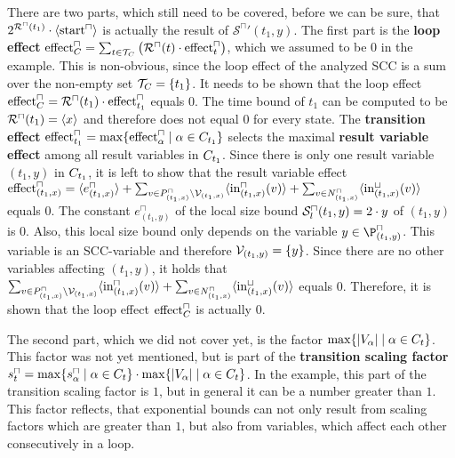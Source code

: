 There are two parts, which still need to be covered, before we can be sure, that $2^{{\mathcal{R}^\sqcap}(t_1)} \cdot \langle\text{start}^\sqcap\rangle$ is actually the result of ${\mathcal{S}^\sqcap}'(t_1,y)$.
The first part is the \textbf{loop effect} $\text{effect}^\sqcap_C = \sum_{t \in \mathcal{T}_C} \left( {\mathcal{R}^\sqcap}(t) \cdot \text{effect}^\sqcap_t \right)$, which we assumed to be $0$ in the example.
This is non-obvious, since the loop effect of the analyzed SCC is a sum over the non-empty set $\mathcal{T}_C = \lbrace t_1 \rbrace$.
It needs to be shown that the loop effect $\text{effect}^\sqcap_C = {\mathcal{R}^\sqcap}(t_1) \cdot \text{effect}^\sqcap_{t_1}$ equals $0$.
The time bound of $t_1$ can be computed to be ${\mathcal{R}^\sqcap}(t_1) = \langle x\rangle$ and therefore does not equal $0$ for every state.
The \textbf{transition effect} $\text{effect}^\sqcap_{t_1} = \max \lbrace \text{effect}^\sqcap_\alpha \mid \alpha \in C_{t_1}  \rbrace$ selects the maximal \textbf{result variable effect} among all result variables in $C_{t_1}$.
Since there is only one result variable $(t_1,y)$ in $C_{t_1}$, it is left to show that the result variable effect $\text{effect}^\sqcap_{(t_1,x)} = \langle e^\sqcap_{(t_1,x)}\rangle + \sum_{v \in P_{(t_1,x)}^\sqcap \setminus \mathcal{V}_{(t_1,x)}} \langle\text{in}^\sqcap_{(t_1,x)}(v)\rangle + \sum_{v \in N_{(t_1,x)}^\sqcap} \langle\text{in}^\sqcup_{(t_1,x)}(v)\rangle$ equals $0$.
The constant $e^\sqcap_{(t_1,y)}$ of the local size bound ${\mathcal{S}^\sqcap_l}(t_1,y) = 2 \cdot y$ of $(t_1,y)$ is $0$.
Also, this local size bound only depends on the variable $y \in \P^\sqcap_{(t_1,y)}$.
This variable is an SCC-variable and therefore $\mathcal{V}_{(t_1,y)} = \lbrace y \rbrace$.
Since there are no other variables affecting $(t_1,y)$, it holds that $\sum_{v \in P_{(t_1,x)}^\sqcap \setminus \mathcal{V}_{(t_1,x)}} \langle\text{in}^\sqcap_{(t_1,x)}(v)\rangle + \sum_{v \in N_{(t_1,x)}^\sqcap} \langle\text{in}^\sqcup_{(t_1,x)}(v)\rangle$ equals $0$.
Therefore, it is shown that the loop effect $\text{effect}^\sqcap_C$ is actually $0$.

The second part, which we did not cover yet, is the factor $\max \lbrace \left|V_\alpha\right| \mid \alpha \in C_t \rbrace$.
This factor was not yet mentioned, but is part of the \textbf{transition scaling factor} $s^\sqcap_t = \max \lbrace s^\sqcap_\alpha \mid \alpha \in C_t \rbrace \cdot \max \lbrace \left|V_\alpha\right| \mid \alpha \in C_t \rbrace$.
In the example, this part of the transition scaling factor is $1$, but in general it can be a number greater than $1$.
This factor reflects, that exponential bounds can not only result from scaling factors which are greater than $1$, but also from variables, which affect each other consecutively in a loop.



